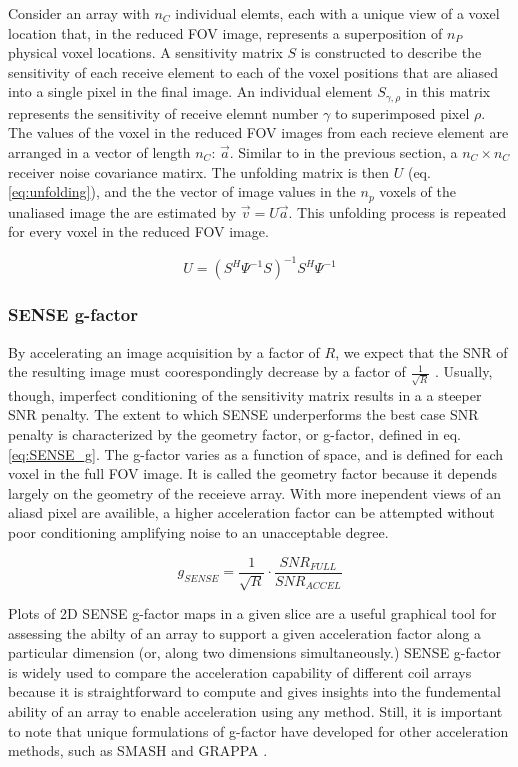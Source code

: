 Consider an array with $n_C$ individual elemts, each with a unique view of a voxel location that, in the reduced FOV
image, represents a superposition of $n_P$ physical voxel locations. A sensitivity matrix $S$ is constructed to describe
the sensitivity of each receive element to each of the voxel positions that are aliased into a single pixel in the final
image. An individual element $S_{\gamma,\rho}$ in this matrix represents the sensitivity of receive elemnt number
$\gamma$ to superimposed pixel $\rho$. The values of the voxel in the reduced FOV images from each recieve element are
arranged in a vector of length $n_C$: $\vec{a}$. Similar to in the previous section, a $n_C \times n_C$ receiver noise covariance
matirx. The unfolding matrix is then $U$ (eq. \ref{eq:unfolding}), and the the vector of image values in the $n_p$
voxels of the unaliased image the are estimated by $\vec{v} = U\vec{a}$. This unfolding process is repeated for every
voxel in the reduced FOV image.

\begin{equation}\label{eq:unfolding}
    U = (S^H\Psi^{-1}S)^{-1}S^H\Psi^{-1}
\end{equation}

\subsubsection{SENSE g-factor}
By accelerating an image acquisition by a factor of $R$, we expect that the SNR of the resulting image must
coorespondingly decrease by a factor of $\frac{1}{\sqrt{R}}$ \cite{nishimura}. Usually, though, imperfect conditioning
of the sensitivity matrix results in a a steeper SNR penalty. The extent to which SENSE underperforms the best case SNR
penalty is characterized by the geometry factor, or g-factor, defined in eq. \ref{eq:SENSE_g}. The g-factor varies as a
function of space, and is defined for each voxel in the full FOV image. It is called the geometry factor because it
depends largely on the geometry of the receieve array. With more inependent views of an aliasd pixel are availible, a
higher acceleration factor can be attempted without poor conditioning amplifying noise to an unacceptable degree.

\begin{equation}\label{eq:SENSE_g}
    g_{SENSE} = \frac{1}{\sqrt{R}} \cdot \frac{SNR_{FULL}}{SNR_{ACCEL}}
\end{equation}

Plots of 2D SENSE g-factor maps in a given slice are a useful graphical tool for assessing the abilty of an array to support
a given acceleration factor along a particular dimension (or, along two dimensions simultaneously.) SENSE g-factor is
widely used to compare the acceleration capability of different coil arrays because it is straightforward to compute and
gives insights into the fundemental ability of an array to enable acceleration using any method. Still, it is important
to note that unique formulations of g-factor have developed for other acceleration methods, such as SMASH and GRAPPA \cite{Breuer2009}.


